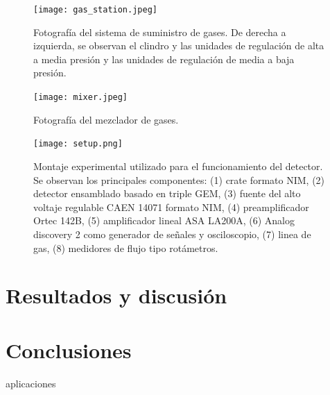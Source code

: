 \documentclass{article}
\begin{document}
\begin{figure}[H]
    \centering
    \texttt{[image: gas\_station.jpeg]}
    \caption{Fotografía del sistema de suministro de gases. De derecha a izquierda, se observan el clindro y las unidades de regulación de alta a media presión y las unidades de regulación de media a baja presión.}
    \label{fig:gas_station}
\end{figure}

\begin{figure}[H]
    \centering
    \texttt{[image: mixer.jpeg]}
    \caption{Fotografía del mezclador de gases.}
    \label{fig:mixer}
\end{figure}
\newpage


\begin{figure}[H]
    \centering
    \texttt{[image: setup.png]}
    \caption{Montaje experimental utilizado para el funcionamiento del detector. Se observan los principales componentes: (1) crate formato NIM, (2) detector ensamblado basado en triple GEM, (3) fuente del alto voltaje regulable CAEN 14071 formato NIM, (4) preamplificador Ortec 142B, (5) amplificador lineal ASA LA200A, (6) Analog discovery 2 como generador de señales y osciloscopio, (7) linea de gas, (8) medidores de flujo tipo rotámetros.}
    \label{fig:setup}
\end{figure}


\section{Resultados y discusión}
\newpage

\section{Conclusiones}
\newpage



\noindent aplicaciones


\newpage



\end{document}
